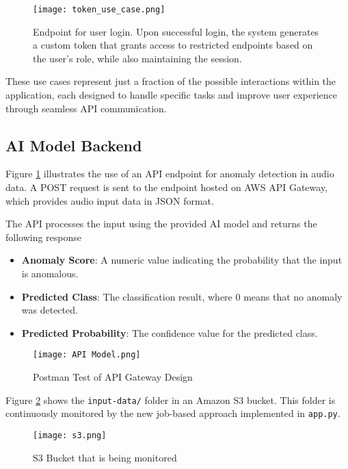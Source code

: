 \documentclass[conference]{IEEEtran}
\begin{document}
\begin{figure}[H]
    \centering
    \texttt{[image: token\_use\_case.png]}
    \caption{ Endpoint for user login. Upon successful login, the system generates a custom token that grants access to restricted endpoints based on the user's role, while also maintaining the session.}
\end{figure}


These use cases represent just a fraction of the possible interactions within the application, each designed to handle specific tasks and improve user experience through seamless API communication.

\subsection{AI Model Backend}

Figure \ref{fig:postman_api} illustrates the use of an API endpoint for anomaly detection in audio data. A POST request is sent to the endpoint hosted on AWS API Gateway, which provides audio input data in JSON format. 

The API processes the input using the provided AI model and returns the following response
\begin{itemize}
    \item \textbf{Anomaly Score}: A numeric value indicating the probability that the input is anomalous.
    \item \textbf{Predicted Class}: The classification result, where 0 means that no anomaly was detected.
    \item \textbf{Predicted Probability}: The confidence value for the predicted class.
\end{itemize}

\begin{figure}[H]
    \centering
    \texttt{[image: API Model.png]}
    \caption{Postman Test of API Gateway Design}
    \label{fig:postman_api}
\end{figure}

Figure \ref{fig:s3} shows the \texttt{input-data/} folder in an Amazon S3 bucket. This folder is continuously monitored by the new job-based approach implemented in \texttt{app.py}. 

\begin{figure}[H]
    \centering
    \texttt{[image: s3.png]}
    \caption{S3 Bucket that is being monitored}
    \label{fig:s3}
\end{figure}
\end{document}
